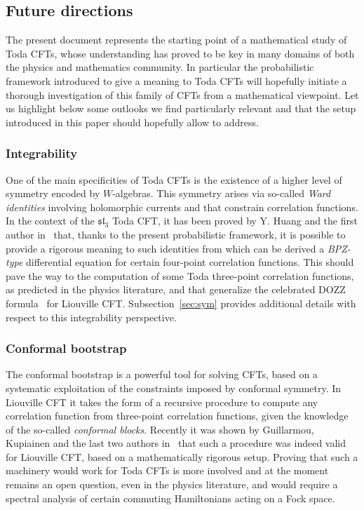 \documentclass[10pt]{amsart}
\theoremstyle{definition}\newtheorem{defi}[theo]{Definition}\newtheorem{rema}[theo]{Remark}\newtheorem{exam}[theo]{Example}\newtheorem{exem}[theo]{Example}\newtheorem{nota}[theo]{Notation}
\newcommand{\frksl}{\mathfrak{sl}}
\begin{document}
\subsection{Future directions}
The present document represents the starting point of a mathematical study of Toda CFTs, whose understanding has proved to be key in many domains of both the physics and mathematics community. In particular the probabilistic framework introduced to give a meaning to Toda CFTs will hopefully initiate a thorough investigation of this family of CFTs from a mathematical viewpoint. Let us highlight below some outlooks we find particularly relevant and that the setup introduced in this paper should hopefully allow to address.

\subsubsection*{Integrability}
 One of the main specificities of Toda CFTs is the existence of a higher level of symmetry encoded by $W$-algebras. This symmetry arises via so-called \emph{Ward identities} involving holomorphic currents and that constrain correlation functions. In the context of the $\frksl_3$ Toda CFT, it has been proved by Y. Huang and the first author in~\cite{Toda_OPEWV} that, thanks to the present probabilistic framework, it is possible to provide a rigorous meaning to such identities from which can be derived a \emph{BPZ-type} differential equation for certain four-point correlation functions. This should pave the way to the computation of some Toda three-point correlation functions, as predicted in the physics literature, and that generalize the celebrated DOZZ formula~\cite{DO94,ZZ96,KRV_DOZZ} for Liouville CFT. Subsection~\ref{sec:sym} provides additional details with respect to this integrability perspective.

\subsubsection*{Conformal bootstrap} 
The conformal bootstrap is a powerful tool for solving CFTs, based on a systematic exploitation of the constraints imposed by conformal symmetry. In Liouville CFT it takes the form of a recursive procedure to compute any correlation function from three-point correlation functions, given the knowledge of the so-called \emph{conformal blocks}. Recently it was shown by Guillarmou, Kupiainen and the last two authors in~\cite{GKRV} that such a procedure was indeed valid for Liouville CFT, based on a mathematically rigorous setup. Proving that such a machinery would work for Toda CFTs is more involved and at the moment remains an open question, even in the physics literature, and would require a spectral analysis of certain commuting Hamiltonians acting on a Fock space.
\end{document}
